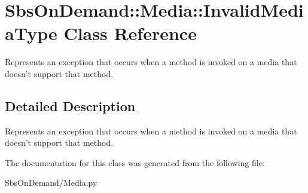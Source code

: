 \hypertarget{class_sbs_on_demand_1_1_media_1_1_invalid_media_type}{
\section{\-Sbs\-On\-Demand\-:\-:\-Media\-:\-:\-Invalid\-Media\-Type \-Class \-Reference}
\label{class_sbs_on_demand_1_1_media_1_1_invalid_media_type}
}


\-Represents an exception that occurs when a method is invoked on a media that doesn't support that method.  




\subsection{\-Detailed \-Description}
\-Represents an exception that occurs when a method is invoked on a media that doesn't support that method. 

\-The documentation for this class was generated from the following file\-:\begin{DoxyCompactItemize}
\item 
\-Sbs\-On\-Demand/\-Media.\-py\end{DoxyCompactItemize}
